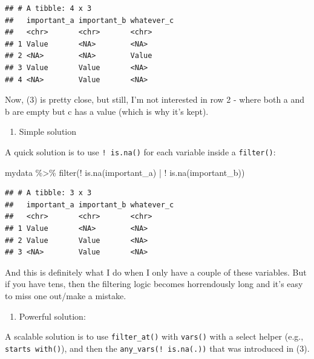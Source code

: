 \documentclass[
]{book}
\newenvironment{Shaded}{\begin{snugshade}}{\end{snugshade}}
\newcommand{\FunctionTok}[1]{\textcolor[rgb]{0.00,0.00,0.00}{#1}}
\newcommand{\NormalTok}[1]{#1}
\newcommand{\SpecialCharTok}[1]{\textcolor[rgb]{0.00,0.00,0.00}{#1}}
\providecommand{\tightlist}{%
  \setlength{\itemsep}{0pt}\setlength{\parskip}{0pt}}
\begin{document}
\begin{verbatim}
## # A tibble: 4 x 3
##   important_a important_b whatever_c
##   <chr>       <chr>       <chr>     
## 1 Value       <NA>        <NA>      
## 2 <NA>        <NA>        Value     
## 3 Value       Value       <NA>      
## 4 <NA>        Value       <NA>
\end{verbatim}

Now, (3) is pretty close, but still, I'm not interested in row 2 - where both a and b are empty but c has a value (which is why it's kept).

\begin{enumerate}
\def\labelenumi{(\arabic{enumi})}
\setcounter{enumi}{3}
\tightlist
\item
  Simple solution
\end{enumerate}

A quick solution is to use \texttt{!\ is.na()} for each variable inside a \texttt{filter()}:

\begin{Shaded}
\begin{Highlighting}[]
\NormalTok{mydata }\SpecialCharTok{\%\textgreater{}\%} 
  \FunctionTok{filter}\NormalTok{(}\SpecialCharTok{!} \FunctionTok{is.na}\NormalTok{(important\_a) }\SpecialCharTok{|} \SpecialCharTok{!} \FunctionTok{is.na}\NormalTok{(important\_b))}
\end{Highlighting}
\end{Shaded}

\begin{verbatim}
## # A tibble: 3 x 3
##   important_a important_b whatever_c
##   <chr>       <chr>       <chr>     
## 1 Value       <NA>        <NA>      
## 2 Value       Value       <NA>      
## 3 <NA>        Value       <NA>
\end{verbatim}

And this is definitely what I do when I only have a couple of these variables. But if you have tens, then the filtering logic becomes horrendously long and it's easy to miss one out/make a mistake.

\begin{enumerate}
\def\labelenumi{(\arabic{enumi})}
\setcounter{enumi}{4}
\tightlist
\item
  Powerful solution:
\end{enumerate}

A scalable solution is to use \texttt{filter\_at()} with \texttt{vars()} with a select helper (e.g., \texttt{starts\ with()}), and then the \texttt{any\_vars(!\ is.na(.))} that was introduced in (3).
\end{document}
